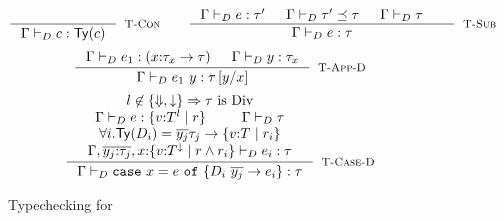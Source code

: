 \begin{figure}[t!]
{$$
\inference{
}{
	\dechastype{\Gamma}{c}{\constty{c}}
}[\rtconst]
\qquad
\inference{
	\dechastype{\Gamma}{e}{\tau'} &&
	\decissubtype{\Gamma}{\tau'}{\tau} &&
	\deciswellformed{\Gamma}{\tau} &&
}{
	\dechastype{\Gamma}{e}{\tau}
}[\rtsub]
$$}
$$
\samerule{
\inference{
	\dechastype{\Gamma, x\colon\tau_x}{e}{\tau} &&
	\deciswellformed{\Gamma}{\tau_x}
}{
	\dechastype{\Gamma}{\efun{x}{e}}{(\tfun{x}{\tau_x}{\tau})}
}[\rtfun]
\qquad}
\inference{
	\dechastype{\Gamma}{e_1}{(\tfunref{x}{\tau_{x}}{\tau}{v}{e_v})} &&
	\dechastype{\Gamma}{\restrictdecidable{y}{e_2}}{\tau_{x}}
}{
	\dechastype{\Gamma}{\eapp{e_1}{\restrictdecidable{y}{e_2}}}{\tau\sub{x}{\restrictdecidable{y}{e_2}}}
}[\rtapp-D]
$$
$$\inference{
	l \not \in \{\finite, \trivial\} \Rightarrow \tau \ \text{is}\ \Div \\
	\dechastype{\Gamma}{e}{\tref{v}{T}{l}{r}} &&
	 \deciswellformed{\Gamma}{\tau}\\
	\forall i. \constty{D_i} = \overline{y_j}{\tau_j} \rightarrow \tref{v}{T}{}{r_i} \\
	\dechastype{\Gamma,  \overline{y_j \colon \tau_j},
				x \colon \tref{v}{T}{\restrictdecidable{\trivial}
				{\ltrivial}
				}{r \land r_i}}{e_i}{\tau}	
}{
	\dechastype{\Gamma}{\ecase{e}{D_i}{\overline{y_j}}{e_i}{x}}{\tau}
}[\rtcased]$$
\caption{Typechecking for \declang}
\label{fig:declang:typing}
\end{figure}

